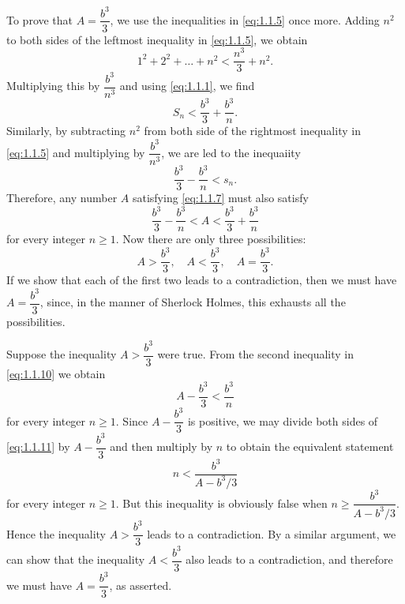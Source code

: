 \begin{note}
  To prove that \(A = \dfrac{b^3}{3}\), we use the inequalities in \cref{eq:1.1.5} once more.
  Adding \(n^2\) to both sides of the leftmost inequality in \cref{eq:1.1.5}, we obtain
  \[
    1^2 + 2^2 + \dots + n^2 < \dfrac{n^3}{3} + n^2.
  \]
  Multiplying this by \(\dfrac{b^3}{n^3}\) and using \cref{eq:1.1.1}, we find
  \begin{equation}\label{eq:1.1.8}
    S_n < \dfrac{b^3}{3} + \dfrac{b^3}{n}.
  \end{equation}
  Similarly, by subtracting \(n^2\) from both side of the rightmost inequality in \cref{eq:1.1.5} and multiplying by \(\dfrac{b^3}{n^3}\), we are led to the inequaiity
  \begin{equation}\label{eq:1.1.9}
    \dfrac{b^3}{3} - \dfrac{b^3}{n} < s_n.
  \end{equation}
  Therefore, any number \(A\) satisfying \cref{eq:1.1.7} must also satisfy
  \begin{equation}\label{eq:1.1.10}
    \dfrac{b^3}{3} - \dfrac{b^3}{n} < A < \dfrac{b^3}{3} + \dfrac{b^3}{n}
  \end{equation}
  for every integer \(n \geq 1\).
  Now there are only three possibilities:
  \[
    A > \dfrac{b^3}{3}, \quad A < \dfrac{b^3}{3}, \quad A = \dfrac{b^3}{3}.
  \]
  If we show that each of the first two leads to a contradiction, then we must have \(A = \dfrac{b^3}{3}\), since, in the manner of Sherlock Holmes, this exhausts all the possibilities.

  Suppose the inequality \(A > \dfrac{b^3}{3}\) were true.
  From the second inequality in \cref{eq:1.1.10} we obtain
  \begin{equation}\label{eq:1.1.11}
    A - \dfrac{b^3}{3} < \dfrac{b^3}{n}
  \end{equation}
  for every integer \(n \geq 1\).
  Since \(A - \dfrac{b^3}{3}\) is positive, we may divide both sides of \cref{eq:1.1.11} by \(A - \dfrac{b^3}{3}\) and then multiply by \(n\) to obtain the equivalent statement
  \[
    n < \dfrac{b^3}{A - b^3 / 3}
  \]
  for every integer \(n \geq 1\).
  But this inequality is obviously false when \(n \geq \dfrac{b^3}{A - b^3 / 3}\).
  Hence the inequality \(A > \dfrac{b^3}{3}\) leads to a contradiction.
  By a similar argument, we can show that the inequality \(A < \dfrac{b^3}{3}\) also leads to a contradiction, and therefore we must have \(A = \dfrac{b^3}{3}\), as asserted.
\end{note}
